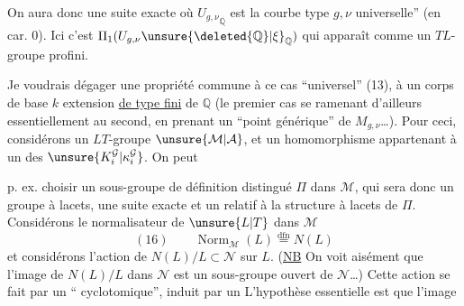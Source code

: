 On aura donc une suite exacte
où ${U_{g,\nu}}_{\mathbb{Q}}$ est la courbe  type $g,\nu$ universelle'' (en car. $0$). Ici c'est $\Pi_1(U_{g,\nu}\unsure{\deleted{\mathbb{Q}}|\xi}_{\mathbb{Q}})$ qui apparaît comme un $TL$-groupe profini.

Je voudrais dégager une propriété commune à ce cas ``universel'' (13),    à un corps de base $k$ extension \uline{de type fini} de $\mathbb{Q}$ (le premier cas se ramenant d'ailleurs essentiellement au second, en prenant un ``point générique'' de $M_{g,\nu}$\ldots). Pour ceci, considérons un $LT$-groupe $\unsure{\mathcal{M}|\mathcal{A}}$, et un  homomorphisme
appartenant à un des $\unsure{K_i^{\mathcal{G}}|\kappa_i^{\mathcal{G}}}$. On peut

p. ex. choisir un sous-groupe de définition distingué $\Pi$ dans $\mathcal{M}$, qui sera donc un groupe à lacets,  une suite exacte
et un 
relatif à la structure à lacets de $\Pi$. Considérons le normalisateur de $\unsure{L|T}$ dans $\mathcal{M}$
\[
(16)\qquad \operatorname{Norm}_{\mathcal{M}}(L)\overset{\mathrm{dfn}}{=}N(L)
\]
et considérons l'action de $N(L)/L\subset\mathcal{N}$  sur $L$. (\uline{NB} On voit aisément que l'image de $N(L)/L$ dans $\mathcal{N}$ est un sous-groupe ouvert de $\mathcal{N}$\ldots) Cette action se fait par un `` cyclotomique'', induit par un 
L'hypothèse essentielle est que l'image


